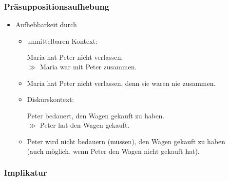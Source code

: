 
\begin{frame}
\frametitle{Präsuppositionsaufhebung}

\begin{itemize}
	\item Aufhebbarkeit durch
	
\vspace{5mm}

	\begin{itemize}
		\item unmittelbaren Kontext:
		
		\ea Maria hat Peter nicht verlassen.\\
			$\gg$ Maria war mit Peter zusammen.
		\z
		
		\item Maria hat Peter nicht verlassen, denn sie waren nie zusammen.
		
\vspace{5mm}

		\item Diskurskontext:
		
		\ea Peter bedauert, den Wagen gekauft zu haben.\\ 
			$\gg$ Peter hat den Wagen gekauft.
		\z
			
		\item Peter wird nicht bedauern (müssen), den Wagen gekauft zu haben \\(auch möglich, wenn Peter den Wagen nicht gekauft hat).
				
	\end{itemize}
					
\end{itemize}


\end{frame}


%
\subsubsection{Implikatur}
%


